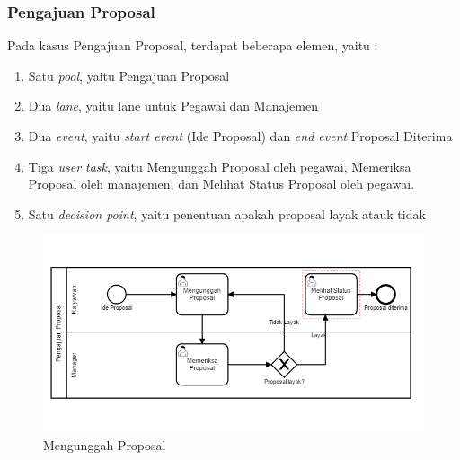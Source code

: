 \subsubsection{Pengajuan Proposal}
\label{workflow_kasus1}
Pada kasus Pengajuan Proposal, terdapat beberapa elemen, yaitu :
\begin{enumerate}
	\item Satu \textit{pool}, yaitu Pengajuan Proposal
	\item Dua \textit{lane}, yaitu lane untuk Pegawai dan Manajemen
	\item Dua \textit{event}, yaitu \textit{start event} (Ide Proposal) dan \textit{end event} Proposal Diterima
	\item Tiga \textit{user task}, yaitu Mengunggah Proposal oleh pegawai, Memeriksa Proposal oleh manajemen, dan Melihat Status Proposal oleh pegawai.
	\item Satu \textit{decision point}, yaitu penentuan apakah proposal layak atauk tidak
\end{enumerate}

	\begin{figure}[H]
			\centering
			\includegraphics[scale=0.5]{Gambar/Bab-3/Kasus2-3}
			\caption{Mengunggah Proposal} 
			\label{fig:workflow_mengunggahproposal}
	\end{figure}
	
